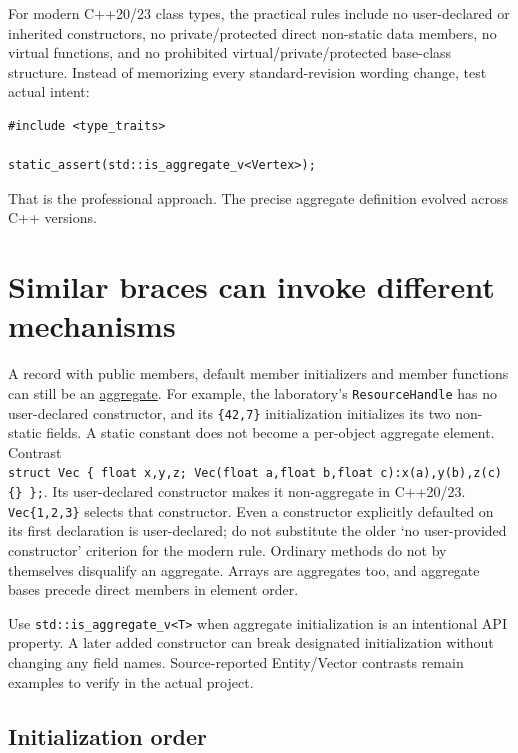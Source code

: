 For modern C++20/23 class types, the practical rules include no user-declared or inherited constructors, no private/protected direct non-static data members, no virtual functions, and no prohibited virtual/private/protected base-class structure. Instead of memorizing every standard-revision wording change, test actual intent:

\begin{verbatim}
#include <type_traits>

static_assert(std::is_aggregate_v<Vertex>);
\end{verbatim}

That is the professional approach. The precise aggregate definition evolved across C++ versions.

\section{Similar braces can invoke different mechanisms}\label{01-foundations-i-ch003-similar-braces-can-invoke-different-mechanisms}

A record with public members, default member initializers and member functions can still be an \hyperref[appendix-b7174c179542]{aggregate}. For example, the laboratory's \texttt{ResourceHandle} has no user-declared constructor, and its \texttt{\{42,7\}} initialization initializes its two non-static fields. A static constant does not become a per-object aggregate element. Contrast \texttt{struct\ Vec\ \{\ float\ x,y,z;\ Vec(float\ a,float\ b,float\ c):x(a),y(b),z(c)\{\}\ \};}. Its user-declared constructor makes it non-aggregate in C++20/23. \texttt{Vec\{1,2,3\}} selects that constructor. Even a constructor explicitly defaulted on its first declaration is user-declared; do not substitute the older `no user-provided constructor' criterion for the modern rule. Ordinary methods do not by themselves disqualify an aggregate. Arrays are aggregates too, and aggregate bases precede direct members in element order.

Use \texttt{std::is\_aggregate\_v\textless{}T\textgreater{}} when aggregate initialization is an intentional API property. A later added constructor can break designated initialization without changing any field names. Source-reported Entity/Vector contrasts remain examples to verify in the actual project.

\subsection{Initialization order}\label{01-foundations-i-ch003-initialization-order}

